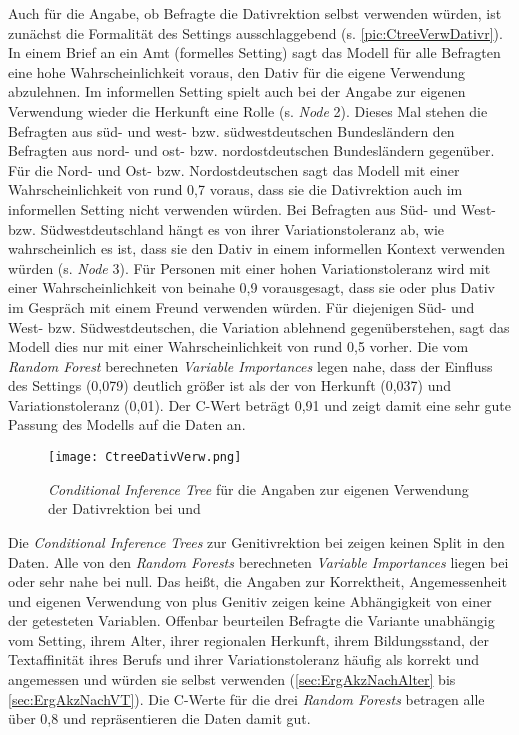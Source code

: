 Auch für die Angabe, ob Befragte die Dativrektion selbst verwenden würden, ist zunächst die Formalität des Settings ausschlaggebend (s. \autoref{pic:CtreeVerwDativr}). 
In einem Brief an ein Amt (formelles Setting) sagt das Modell für alle Befragten eine hohe Wahrscheinlichkeit voraus, den Dativ für die eigene Verwendung abzulehnen. 
Im informellen Setting spielt auch bei der Angabe zur eigenen Verwendung wieder die Herkunft eine Rolle (s. \textit{Node} 2). 
Dieses Mal stehen die Befragten aus süd- und west- bzw. südwestdeutschen Bundesländern den Befragten aus nord- und ost- bzw. nordostdeutschen Bundesländern gegenüber.
Für die Nord- und Ost- bzw. Nordostdeutschen sagt das Modell mit einer Wahrscheinlichkeit von rund 0,7 voraus, dass sie die Dativrektion auch im informellen Setting nicht verwenden würden. 
Bei Befragten aus Süd- und West- bzw. Südwestdeutschland hängt es von ihrer Variationstoleranz ab, wie wahrscheinlich es ist, dass sie den Dativ in einem informellen Kontext verwenden würden (s. \textit{Node} 3). 
Für Personen mit einer hohen Variationstoleranz wird mit einer Wahrscheinlichkeit von beinahe 0,9 vorausgesagt, dass sie \wegen{} oder \waehrend{} plus Dativ im Gespräch mit einem Freund verwenden würden. 
Für diejenigen Süd- und West- bzw. Südwestdeutschen, die Variation ablehnend gegenüberstehen, sagt das Modell dies nur mit einer Wahrscheinlichkeit von rund 0,5 vorher. 
Die vom \textit{Random Forest} berechneten \textit{Variable Importances} legen nahe, dass der Einfluss des Settings (0,079) deutlich größer ist als der von Herkunft (0,037) und Variationstoleranz (0,01). 
Der C-Wert beträgt 0,91 und zeigt damit eine sehr gute Passung des Modells auf die Daten an. 

\begin{figure}[p]
\centering
\texttt{[image: CtreeDativVerw.png]}
\caption{\textit{Conditional Inference Tree} für die Angaben zur eigenen Verwendung der Dativrektion bei \wegen{} und \waehrend}
\label{pic:CtreeVerwDativr}
\end{figure}

Die \textit{Conditional Inference Trees} zur Genitivrektion bei \dank{} zeigen keinen Split in den Daten.
Alle von den \textit{Random Forests} berechneten \textit{Variable Importances} liegen bei oder sehr nahe bei null.
Das heißt, die Angaben zur Korrektheit, Angemessenheit und eigenen Verwendung von \dank{} plus Genitiv zeigen keine Abhängigkeit von einer der getesteten Variablen. 
Offenbar beurteilen Befragte die Variante unabhängig vom Setting, ihrem Alter, ihrer regionalen Herkunft, ihrem Bildungsstand, der Textaffinität ihres Berufs und ihrer Variationstoleranz häufig als korrekt und angemessen und würden sie selbst verwenden (\autoref{sec:ErgAkzNachAlter} bis \autoref{sec:ErgAkzNachVT}). 
Die C-Werte für die drei \textit{Random Forests} betragen alle über 0,8 und repräsentieren die Daten damit gut.

